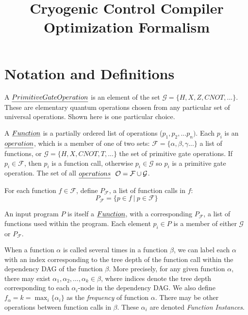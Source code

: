 \documentclass[12pt,twoside]{article}
\begin{document}
\title{Cryogenic Control Compiler Optimization Formalism}


\maketitle

\section{Notation and Definitions}
\begin{definition} A $\emph{Primitive Gate Operation}$ is an element of the set $\mathcal{G} = \{H, X, Z, CNOT, ...\}$. These are elementary quantum operations chosen from any particular set of universal operations. Shown here is one particular choice.
\end{definition}

\begin{definition} A $\emph{Function}$ is a partially ordered list of operations ($p_1, p_2, ... p_n)$. Each $p_i$ is an $\emph{operation}$, which is a member of one of two sets: $\mathcal{F} = \{\alpha, \beta, \gamma ... \}$ a list of functions, or $\mathcal{G} = \{H, X, CNOT, T, ... \}$ the set of primitive gate operations. If $p_i \in \mathcal{F}$, then $p_i$ is a function call, otherwise $p_i \in \mathcal{G}$ so $p_i$ is a primitive gate operation. The set of all $\emph{operations}\ \  \mathcal{O} = \mathcal{F} \cup \mathcal{G}$.
\end{definition}
\begin{definition} For each function $f \in \mathcal{F}$, define $P_{\mathcal{F}}$, a list of function calls in $f$:
	\begin{equation}
		P_{\mathcal{F}} = \{p \in f\ |\ p \in \mathcal{F}\}
	\end{equation}
\end{definition}


\begin{definition} An input program $P$ is itself a $\emph{Function}$, with a corresponding $P_{\mathcal{F}}$, a list of functions used within the program. Each element $p_i \in P$ is a member of either $\mathcal{G}$ or $P_{\mathcal{F}}$. 
\end{definition}

\begin{definition} When a function $\alpha$ is called several times in a function $\beta$, we can label each $\alpha$ with an index corresponding to the tree depth of the function call within the dependency DAG of the function $\beta$. More precisely, for any given function $\alpha$, there may exist $\alpha_1, \alpha_2, ... , \alpha_k \in \beta$, where indices denote the tree depth corresponding to each $\alpha_i$-node in the dependency DAG. We also define $f_{\alpha} = k = \max_i \{\alpha_i\}$ as the \emph{frequency} of function $\alpha$. There may be other operations between function calls in $\beta$. These $\alpha_i$ are denoted \emph{Function Instances}. 
\end{definition}
\end{document}
